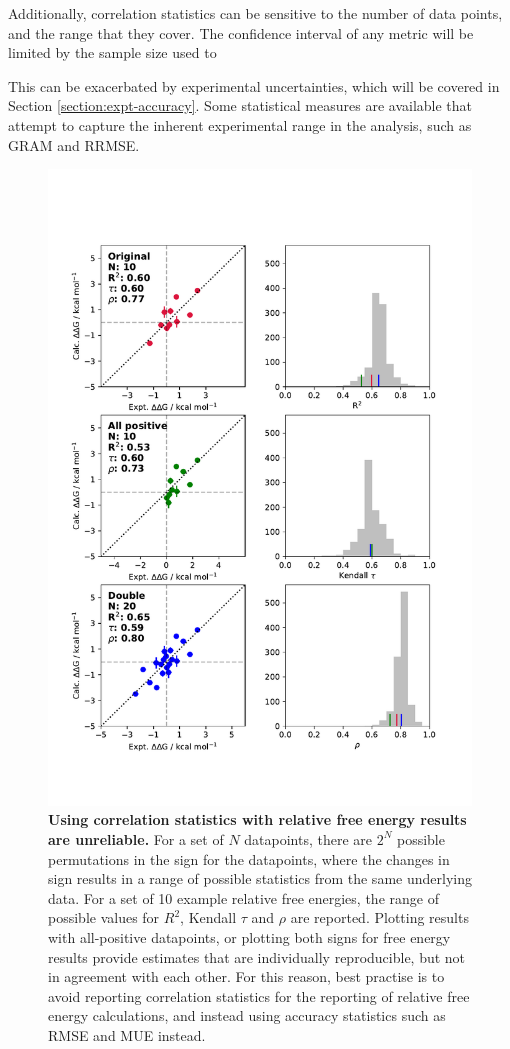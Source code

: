 \documentclass[9pt,bestpractices]{livecoms}
\begin{document}
Additionally, correlation statistics can be sensitive to the number of data points, and the range that they cover. The confidence interval of any metric will be limited by the sample size used to 

This can be exacerbated by experimental uncertainties, which will be covered in Section \ref{section:expt-accuracy}. Some statistical measures are available that attempt to capture the inherent experimental range in the analysis, such as GRAM\cite{} and RRMSE\cite{}.\\


\begin{figure}
    \includegraphics[width=0.95\linewidth]{figures/reporting/doublevalues.pdf}
    \caption{\textbf{Using correlation statistics with relative free energy results are unreliable.} For a set of $N$ datapoints, there are $2^N$ possible permutations in the sign for the datapoints, where the changes in sign results in a range of possible statistics from the same underlying data. For a set of 10 example relative free energies, the range of possible values for $R^2$, Kendall $\tau$ and $\rho$ are reported. Plotting results with all-positive datapoints, or plotting both signs for free energy results provide estimates that are individually reproducible, but not in agreement with each other. For this reason, best practise is to avoid reporting correlation statistics for the reporting of relative free energy calculations, and instead using accuracy  statistics such as RMSE and MUE instead.}
    \label{fig:changing-corr}
\end{figure}
\end{document}
